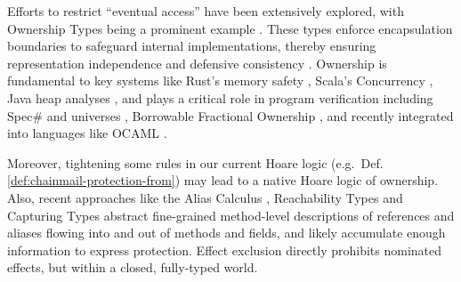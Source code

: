    Efforts to restrict ``eventual access'' have been extensively explored, with
 Ownership Types  being a prominent example \cite{simpleOwnership,existOwn}.
These types enforce encapsulation boundaries to safeguard internal implementations, thereby ensuring representation independence and defensive consistency
\cite{ownalias,NobPotVitECOOP98,Banerjee:2005}.
Ownership is fundamental to key systems like Rust’s memory safety  
\cite{RustPL2,RustBelt18},
Scala's Concurrency \cite{ScalaCapabilities,ScalaLightweightAffine},
Java heap analyses \cite{PotterNC98,HillNP02,MitECOOP06}, 
and   plays a critical role in program verification
\cite{BoyLisShrPOPL03,hypervisor} including Spec$\#$
\cite{BarLeiSch05,BarDelFahLeiSch04} and universes
\cite{DieDroMue07,DietlMueller05,LuPotPOPL06},
Borrowable Fractional Ownership \cite{borrow-fract-vmcai2024},
and recently integrated into languages like OCAML \cite{ocaml-ownership-icfp2024,funk-ownership-oopsla2024}.


Moreover,  tightening some
rules in our current Hoare logic (e.g.\ Def. \ref{def:chainmail-protection-from})
may lead to a native  Hoare logic of ownership.
Also, recent approaches like
%
%
the Alias
Calculus \cite{meyer-alias-calculus-scp2015,meyer-auto-alias-sncs2020},
Reachability
Types \cite{romf-reachability-types-oopsla2021,rompf-poly-reachability-oopsla2024}
and Capturing
Types \cite{odersky-capturing-types-toplas2023,scoped-effects-oopsla2022,odersky-reach-prog2024}
abstract fine-grained method-level descriptions of 
references and aliases flowing into and out of methods and fields,
and likely accumulate enough information to express 
protection. Effect exclusion
\cite{fx-exclusion-icfp2023} directly prohibits nominated
effects, but within a closed, fully-typed world.



